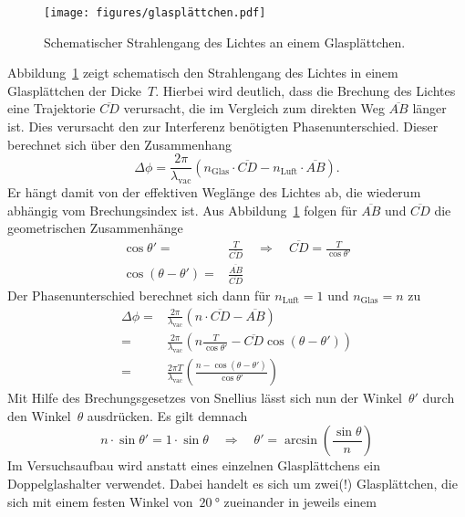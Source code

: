 \begin{figure}[htb]
  \centering
  \texttt{[image: figures/glasplättchen.pdf]}
  \caption{Schematischer Strahlengang des Lichtes an einem Glasplättchen.}
  \label{fig:plättchen}
\end{figure}

Abbildung~\ref{fig:plättchen} zeigt schematisch den Strahlengang des Lichtes in
einem Glasplättchen der Dicke~$T$. Hierbei wird deutlich, dass die Brechung des
Lichtes eine Trajektorie $\overline{CD}$ verursacht, die im Vergleich zum
direkten Weg $\overline{AB}$ länger ist. Dies verursacht den zur Interferenz
benötigten Phasenunterschied. Dieser berechnet sich über den Zusammenhang
\begin{equation}
  \Delta\phi=\frac{2\pi}{\lambda_{\text{vac}}}\left(n_{\text{Glas}}\cdot
  \overline{CD}-n_{\text{Luft}}\cdot\overline{AB}\right).
\end{equation}
Er hängt damit von der effektiven Weglänge des Lichtes ab, die wiederum abhängig
vom Brechungsindex ist. Aus Abbildung~\ref{fig:plättchen} folgen für
$\overline{AB}$ und $\overline{CD}$ die geometrischen Zusammenhänge
\begin{align}
  \cos\theta'=&\frac{T}{\overline{CD}}\quad\Rightarrow\quad\overline{CD}
  =\frac{T}{\cos\theta'} \\
  \cos(\theta-\theta')=&\frac{\overline{AB}}{\overline{CD}}
\end{align}
Der Phasenunterschied berechnet sich dann für $n_{\text{Luft}}=1$ und
$n_{\text{Glas}}=n$ zu
\begin{align}
  \Delta\phi=&\frac{2\pi}{\lambda_{\text{vac}}}(n\cdot\overline{CD}
  -\overline{AB}) \\
  =&\frac{2\pi}{\lambda_{\text{vac}}}\left(n\frac{T}{\cos{\theta'}}
  -\overline{CD}\cos(\theta-\theta')\right) \\
  =&\frac{2\pi T}{\lambda_{\text{vac}}}\left(\frac{n-\cos(\theta-\theta')}
  {\cos\theta'}\right)
\end{align}
Mit Hilfe des Brechungsgesetzes von Snellius lässt sich nun der Winkel~$\theta'$
durch den Winkel~$\theta$ ausdrücken. Es gilt demnach
\begin{equation}
  n\cdot\sin\theta'=1\cdot\sin\theta\quad\Rightarrow\quad\theta'
  =\arcsin\left(\frac{\sin\theta}{n}\right)
\end{equation}
Im Versuchsaufbau wird anstatt eines einzelnen Glasplättchens ein
Doppelglashalter verwendet. Dabei handelt es sich um zwei(!) Glasplättchen, die
sich mit einem festen Winkel von~$\SI{20}{\degree}$ zueinander in jeweils einem
